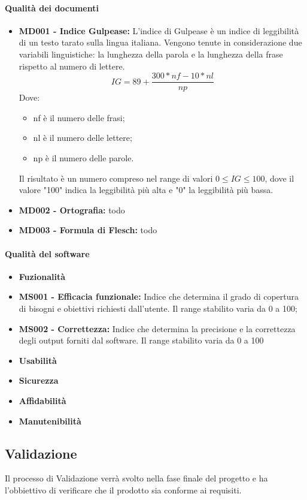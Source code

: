 \paragraph{Qualità dei documenti}
\begin{itemize}
	\item \textbf{MD001 - Indice Gulpease:} L'indice di Gulpease è un indice di leggibilità di un testo tarato sulla lingua italiana. Vengono tenute in considerazione due variabili linguistiche:  la lunghezza della parola e la lunghezza della frase rispetto al numero di lettere.
	\[ IG = 89+ \frac{300*nf - 10*nl}{np} \]
	Dove:
	\begin{itemize}
		\item nf è il numero delle frasi;
		\item nl è il numero delle lettere;
		\item np è il numero delle parole.
	\end{itemize}
	Il risultato è un numero compreso nel range di valori $0 \le{IG} \le{100}$, dove il valore "100" indica la leggibilità più alta e "0" la leggibilità più bassa.
	
	\item \textbf{MD002 - Ortografia:} todo
	\item \textbf{MD003 - Formula di Flesch:} todo
\end{itemize}

\paragraph{Qualità del software} 
\begin{itemize}
	\item []\textbf{Fuzionalità}%
	\item \textbf{MS001 - Efficacia funzionale:} Indice che determina il grado di copertura di bisogni e obiettivi richiesti dall'utente. Il range stabilito varia da 0 a 100;
	\item \textbf{MS002 - Correttezza:} Indice che determina la precisione e la correttezza degli output forniti dal software. Il range stabilito varia da 0 a 100
	\item []\textbf{Usabilità}%
	\item []\textbf{Sicurezza}%
	\item []\textbf{Affidabilità}%
	\item []\textbf{Manutenibilità}%



\end{itemize}







\subsection{Validazione}
Il processo di Validazione verrà svolto nella fase finale del progetto e ha l'obbiettivo di verificare che il prodotto sia conforme ai requisiti.